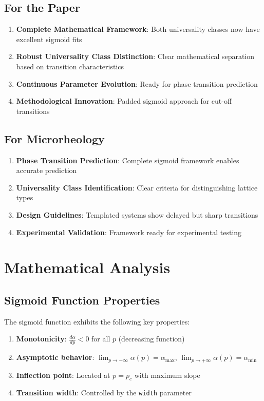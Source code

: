 \documentclass[11pt]{article}
\begin{document}
\subsection{For the Paper}

\begin{enumerate}
    \item \textbf{Complete Mathematical Framework}: Both universality classes now have excellent sigmoid fits
    \item \textbf{Robust Universality Class Distinction}: Clear mathematical separation based on transition characteristics
    \item \textbf{Continuous Parameter Evolution}: Ready for phase transition prediction
    \item \textbf{Methodological Innovation}: Padded sigmoid approach for cut-off transitions
\end{enumerate}

\subsection{For Microrheology}

\begin{enumerate}
    \item \textbf{Phase Transition Prediction}: Complete sigmoid framework enables accurate prediction
    \item \textbf{Universality Class Identification}: Clear criteria for distinguishing lattice types
    \item \textbf{Design Guidelines}: Templated systems show delayed but sharp transitions
    \item \textbf{Experimental Validation}: Framework ready for experimental testing
\end{enumerate}

\section{Mathematical Analysis}

\subsection{Sigmoid Function Properties}

The sigmoid function exhibits the following key properties:

\begin{enumerate}
    \item \textbf{Monotonicity}: $\frac{d\alpha}{dp} < 0$ for all $p$ (decreasing function)
    \item \textbf{Asymptotic behavior}: $\lim_{p \to -\infty} \alpha(p) = \alpha_{\max}$, $\lim_{p \to +\infty} \alpha(p) = \alpha_{\min}$
    \item \textbf{Inflection point}: Located at $p = p_c$ with maximum slope
    \item \textbf{Transition width}: Controlled by the \texttt{width} parameter
\end{enumerate}
\end{document}
